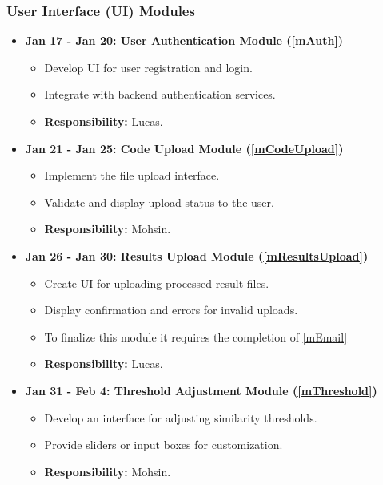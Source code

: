 \documentclass[12pt, titlepage]{article}
\begin{document}
\subsubsection{User Interface (UI) Modules}
\begin{itemize}
    \item \textbf{Jan 17 - Jan 20: User Authentication Module (\ref{mAuth})}
    \begin{itemize}
        \item Develop UI for user registration and login.
        \item Integrate with backend authentication services.
        \item \textbf{Responsibility:} Lucas.
    \end{itemize}
    
    \item \textbf{Jan 21 - Jan 25: Code Upload Module (\ref{mCodeUpload})}
    \begin{itemize}
        \item Implement the file upload interface.
        \item Validate and display upload status to the user.
        \item \textbf{Responsibility:} Mohsin.
    \end{itemize}
    
    \item \textbf{Jan 26 - Jan 30: Results Upload Module (\ref{mResultsUpload})}
    \begin{itemize}
        \item Create UI for uploading processed result files.
        \item Display confirmation and errors for invalid uploads.
        \item To finalize this module it requires the completion of \ref{mEmail}
        \item \textbf{Responsibility:} Lucas.
    \end{itemize}
    
    \item \textbf{Jan 31 - Feb 4: Threshold Adjustment Module (\ref{mThreshold})}
    \begin{itemize}
        \item Develop an interface for adjusting similarity thresholds.
        \item Provide sliders or input boxes for customization.
        \item \textbf{Responsibility:} Mohsin.
    \end{itemize}
    

\end{itemize}
\end{document}

